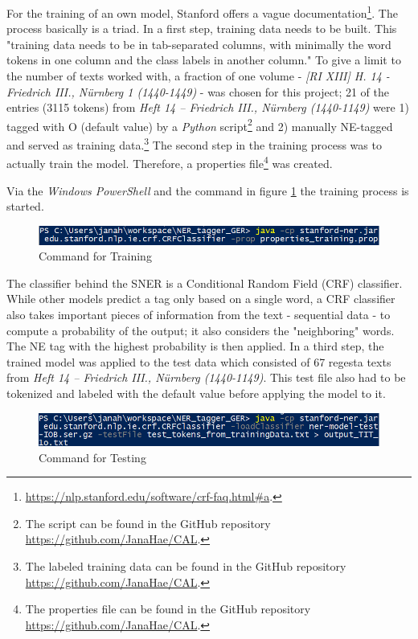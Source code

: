 \documentclass[11pt,a4paper]{article}
\begin{document}
For the training of an own model, Stanford offers a vague documentation\footnote{\url{https://nlp.stanford.edu/software/crf-faq.html\#a}.}. The process basically is a triad. In a first step, training data needs to be built. This "training data needs to be in tab-separated columns, with minimally the word tokens in one column and the class labels in another column." To give a limit to the number of texts worked with, a fraction of one volume - \textit{[RI XIII] H. 14 - Friedrich III., N{\"u}rnberg 1 (1440-1449)} - was chosen for this project; 21 of the entries (3115 tokens) from \textit{Heft 14 – Friedrich III., N{\"u}rnberg (1440-1149)} were 1) tagged with O (default value) by a \textit{Python} script\footnote{The script can be found in the GitHub repository \url{https://github.com/JanaHae/CAL}.} and 2) manually NE-tagged and served as training data.\footnote{The labeled training data can be found in the GitHub repository \url{https://github.com/JanaHae/CAL}.} The second step in the training process was to actually train the model. Therefore, a properties file\footnote{The properties file can be found in the GitHub repository \url{https://github.com/JanaHae/CAL}.} was created.

Via the \textit{Windows PowerShell} and the command in figure \ref{fig:TrainingCommand} the training process is started.
\begin{figure}[h]
	\includegraphics[scale=0.437]{command_training}
	\centering
	\caption{Command for Training}
	\label{fig:TrainingCommand}
\end{figure}

The classifier behind the SNER is a Conditional Random Field (CRF) classifier. While other models predict a tag only based on a single word, a CRF classifier also takes important pieces of information from the text - sequential data - to compute a probability of the output; it also considers the "neighboring" words. The NE tag with the highest probability is then applied. In a third step, the trained model was applied to the test data which consisted of 67 regesta texts from \textit{Heft 14 – Friedrich III., N{\"u}rnberg (1440-1149)}. This test file also had to be tokenized and labeled with the default value before applying the model to it.
\begin{figure}[h]
	\includegraphics[scale=0.437]{command_testing}
	\centering
	\caption{Command for Testing}
	\label{fig:TestingCommand}
\end{figure}
\end{document}
